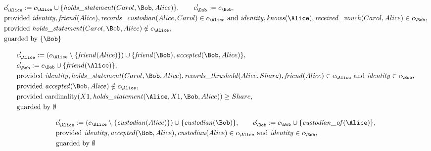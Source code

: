 \begin{align*}
&
c'_
{
\Alice
}
 := 
c_
{
\Alice
}
 \cup 
\{
\mathit{\detokenize{
holds_statement
}}
(
Carol
,
\Bob
,
Alice
)
\}
, \qquad 
c'_
{
\Bob
}
 := 
c_
{
\Bob
}
,\\
&
\text{provided } 
\mathit{\detokenize{
identity
}}
,
\mathit{\detokenize{
friend
}}
(
Alice
)
,
\mathit{\detokenize{
records_custodian
}}
(
Alice
,
Carol
)
 \in c_
{
\Alice
}
 \text{ and } 
\mathit{\detokenize{
identity
}}
,
\mathit{\detokenize{
knows
}}
(
\Alice
)
,
\mathit{\detokenize{
received_vouch
}}
(
Carol
,
Alice
)
 \in c_
{
\Bob
}
,\\
&
\text{provided } 
\mathit{\detokenize{
holds_statement
}}
(
Carol
,
\Bob
,
Alice
)
 \notin c_
{
\Alice
}
,\\
&
\text{guarded by } \{
\Bob
\}
\end{align*}

\begin{align*}
&
c'_
{
\Alice
}
 := 
(c_
{
\Alice
}
 \setminus 
\{
\mathit{\detokenize{
friend
}}
(
Alice
)
\}
) \cup 
\{
\mathit{\detokenize{
friend
}}
(
\Bob
)
,
\mathit{\detokenize{
accepted
}}
(
\Bob
,
Alice
)
\}
,\\
&
c'_
{
\Bob
}
 := 
c_
{
\Bob
}
 \cup 
\{
\mathit{\detokenize{
friend
}}
(
\Alice
)
\}
,\\
&
\text{provided } 
\mathit{\detokenize{
identity
}}
,
\mathit{\detokenize{
holds_statement
}}
(
Carol
,
\Bob
,
Alice
)
,
\mathit{\detokenize{
records_threshold
}}
(
Alice
,
Share
)
,
\mathit{\detokenize{
friend
}}
(
Alice
)
 \in c_
{
\Alice
}
 \text{ and } 
\mathit{\detokenize{
identity
}}
 \in c_
{
\Bob
}
,\\
&
\text{provided } 
\mathit{\detokenize{
accepted
}}
(
\Bob
,
Alice
)
 \notin c_
{
\Alice
}
,\\
&
\text{provided } 
\mathrm{cardinality}(
X1
,
\mathit{\detokenize{
holds_statement
}}
(
\Alice
,
X1
,
\Bob
,
Alice
)
)
\ge
Share
,\\
&
\text{guarded by } \emptyset
\end{align*}

\begin{align*}
&
c'_
{
\Alice
}
 := 
(c_
{
\Alice
}
 \setminus 
\{
\mathit{\detokenize{
custodian
}}
(
Alice
)
\}
) \cup 
\{
\mathit{\detokenize{
custodian
}}
(
\Bob
)
\}
, \qquad 
c'_
{
\Bob
}
 := 
c_
{
\Bob
}
 \cup 
\{
\mathit{\detokenize{
custodian_of
}}
(
\Alice
)
\}
,\\
&
\text{provided } 
\mathit{\detokenize{
identity
}}
,
\mathit{\detokenize{
accepted
}}
(
\Bob
,
Alice
)
,
\mathit{\detokenize{
custodian
}}
(
Alice
)
 \in c_
{
\Alice
}
 \text{ and } 
\mathit{\detokenize{
identity
}}
 \in c_
{
\Bob
}
,\\
&
\text{guarded by } \emptyset
\end{align*}
